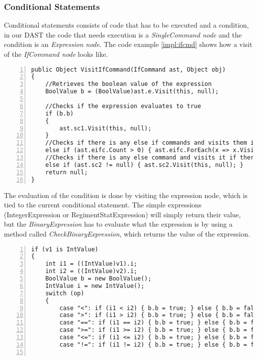 {	\subsubsection{Conditional Statements}
		Conditional statements consists of code that has to be executed and a condition, in our DAST the code that needs execution is a 
		{\it SingleCommand node} and the condition is an {\it Expression node}. 
		The code example \ref{impl:ifcmd} shows how a visit of the {\it IfCommand node} looks like.
		\begin{lstlisting}[basicstyle=\small\sffamily,
			keywords={break,case,const,continue,default,else,enum,
			for,if,return,switch,while,do,long,void,int,float,double,
			char,struct,typedef,include,size\_t},
			keywordstyle={\color{blue}},
			comment={[l]{//}}, morecomment={[s]{/*}{*/}}, commentstyle=\itshape,
			columns={[l]flexible}, numbers=left, numberstyle=\tiny,
			frameround=fftt, frame=shadowbox, captionpos=b,
			caption={VisitIfCommand method from the class BehaviourInterpreter},
			label=impl:ifcmd]
public Object VisitIfCommand(IfCommand ast, Object obj)
{
	//Retrieves the boolean value of the expression
	BoolValue b = (BoolValue)ast.e.Visit(this, null);
	
	//Checks if the expression evaluates to true
	if (b.b)
	{
		ast.sc1.Visit(this, null);
	}
	//Checks if there is any else if commands and visits them if there is
	else if (ast.eifc.Count > 0) { ast.eifc.ForEach(x => x.Visit(this, null)); }
	//Checks if there is any else command and visits it if there is
	else if (ast.sc2 != null) { ast.sc2.Visit(this, null); }
	return null;
}	
		\end{lstlisting}
		The evaluation of the condition is done by visiting the expression node, which is tied to the current conditional statement. 
		The simple expressions (IntegerExpression or RegimentStatExpression) will simply return their value, but the {\it BinaryExpression} 
		has to evaluate what the expression is by using a method called {\it CheckBinaryExpression}, which returns the value of the expression.
		\begin{lstlisting}[basicstyle=\small\sffamily,
			keywords={break,case,const,continue,default,else,enum,
			for,if,return,switch,while,do,long,void,int,float,double,
			char,struct,typedef,include,size\_t},
			keywordstyle={\color{blue}},
			comment={[l]{//}}, morecomment={[s]{/*}{*/}}, commentstyle=\itshape,
			columns={[l]flexible}, numbers=left, numberstyle=\tiny,
			frameround=fftt, frame=shadowbox, captionpos=b,
			caption={Code snippet from CheckBinaryExpression},
			label=impl:chkbexp]
if (v1 is IntValue)
{
	int i1 = ((IntValue)v1).i;
	int i2 = ((IntValue)v2).i;
	BoolValue b = new BoolValue();
	IntValue i = new IntValue();
	switch (op)
	{
		case "<": if (i1 < i2) { b.b = true; } else { b.b = false; } return b;
		case ">": if (i1 > i2) { b.b = true; } else { b.b = false; } return b;
		case "==": if (i1 == i2) { b.b = true; } else { b.b = false; } return b;
		case ">=": if (i1 >= i2) { b.b = true; } else { b.b = false; } return b;
		case "<=": if (i1 <= i2) { b.b = true; } else { b.b = false; } return b;
		case "!=": if (i1 != i2) { b.b = true; } else { b.b = false; } return b;


\end{lstlisting}}
